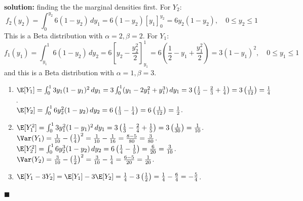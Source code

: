 \documentclass[11pt, letterpaper]{article}
\begin{document}
\textbf{solution:}
finding the the marginal densities first.
For $Y_2$:
\[
f_2(y_2) = \int_0^{y_2} 6(1 - y_2) \, dy_1 = 6(1 - y_2)[y_1]_0^{y_2} = 6y_2(1 - y_2), \quad 0 \leq y_2 \leq 1
\]
This is a Beta distribution with $\alpha=2, \beta=2$.
For $Y_1$:
\[
f_1(y_1) = \int_{y_1}^1 6(1 - y_2) \, dy_2 = 6 \left[ y_2 - \frac{y_2^2}{2} \right]_{y_1}^1 = 6 \left( \frac{1}{2} - y_1 + \frac{y_1^2}{2} \right) = 3(1 - y_1)^2, \quad 0 \leq y_1 \leq 1
\]
and this is a Beta distribution with $\alpha=1, \beta=3$.
\begin{enumerate}[label=\alph*)]
    \item $\E[Y_1] = \int_0^1 3y_1(1-y_1)^2 \, dy_1 = 3 \int_0^1 (y_1 - 2y_1^2 + y_1^3) \, dy_1 = 3\left(\frac{1}{2} - \frac{2}{3} + \frac{1}{4}\right) = 3\left(\frac{1}{12}\right) = \frac{1}{4}$. \\ \relax
    $\E[Y_2] = \int_0^1 6y_2^2(1-y_2) \, dy_2 = 6\left(\frac{1}{3} - \frac{1}{4}\right) = 6\left(\frac{1}{12}\right) = \frac{1}{2}$.
    \item $\E[Y_1^2] = \int_0^1 3y_1^2(1-y_1)^2 \, dy_1 = 3\left(\frac{1}{3} - \frac{2}{4} + \frac{1}{5}\right) = 3\left(\frac{1}{30}\right) = \frac{1}{10}$. \\ \relax
    $\Var(Y_1) = \frac{1}{10} - \left(\frac{1}{4}\right)^2 = \frac{1}{10} - \frac{1}{16} = \frac{8 - 5}{80} = \frac{3}{80}$. \\ \relax
    $\E[Y_2^2] = \int_0^1 6y_2^3(1-y_2) \, dy_2 = 6\left(\frac{1}{4} - \frac{1}{5}\right) = \frac{6}{20} = \frac{3}{10}$. \\ \relax
    $\Var(Y_2) = \frac{3}{10} - \left(\frac{1}{2}\right)^2 = \frac{3}{10} - \frac{1}{4} = \frac{6 - 5}{20} = \frac{1}{20}$.
    \item $\E[Y_1 - 3Y_2] = \E[Y_1] - 3\E[Y_2] = \frac{1}{4} - 3\left(\frac{1}{2}\right) = \frac{1}{4} - \frac{6}{4} = -\frac{5}{4}$.
\end{enumerate}
\hfill $\blacksquare$
\end{document}

